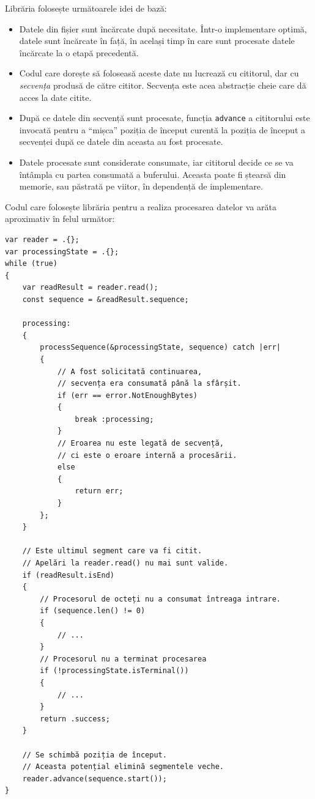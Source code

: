 \documentclass[a4paper,12pt]{report}
\begin{document}
Librăria folosește următoarele idei de bază:
\begin{itemize}
    \item 
        Datele din fișier sunt încărcate după necesitate.
        Într-o implementare optimă, datele sunt încărcate în față, în același timp în care sunt procesate
        datele încărcate la o etapă precedentă.

    \item
        Codul care dorește să foloseasă aceste date nu lucrează cu cititorul,
        dar cu \textit{secvența} produsă de către cititor.
        Secvența este acea abstracție cheie care dă acces la date citite.

    \item
        După ce datele din secvență sunt procesate,
        funcția \texttt{advance} a cititorului este invocată pentru
        a ``mișca'' poziția de început curentă la poziția de început 
        a secvenței după ce datele din aceasta au fost procesate.

    \item
        Datele procesate sunt considerate consumate,
        iar cititorul decide ce se va întâmpla cu partea consumată a buferului.
        Aceasta poate fi ștearsă din memorie, sau păstrată pe viitor, în dependență de implementare.
\end{itemize}

Codul care folosește librăria pentru a realiza procesarea datelor
va arăta aproximativ în felul următor:

\begin{verbatim}
var reader = .{};
var processingState = .{};
while (true)
{
    var readResult = reader.read();
    const sequence = &readResult.sequence;

    processing:
    {
        processSequence(&processingState, sequence) catch |err|
        {
            // A fost solicitată continuarea,
            // secvența era consumată până la sfârșit.
            if (err == error.NotEnoughBytes)
            {
                break :processing;
            }
            // Eroarea nu este legată de secvență,
            // ci este o eroare internă a procesării.
            else
            {
                return err;
            }
        };
    }

    // Este ultimul segment care va fi citit.
    // Apelări la reader.read() nu mai sunt valide.
    if (readResult.isEnd)
    {
        // Procesorul de octeți nu a consumat întreaga intrare.
        if (sequence.len() != 0)
        {
            // ...
        }
        // Procesorul nu a terminat procesarea
        if (!processingState.isTerminal())
        {
            // ...
        }
        return .success;
    }

    // Se schimbă poziția de început.
    // Aceasta potențial elimină segmentele veche.
    reader.advance(sequence.start());
}
\end{verbatim}
\end{document}
